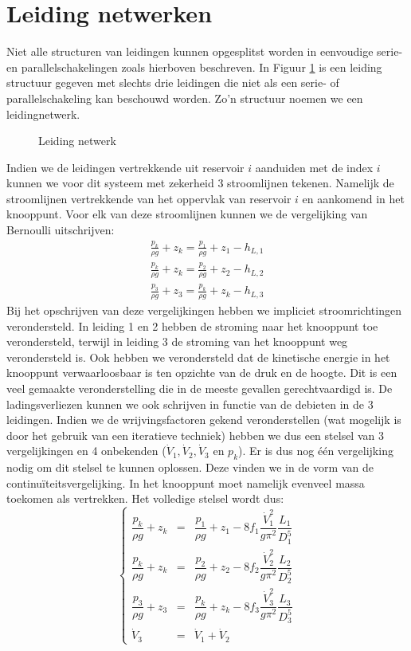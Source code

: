 	\section{Leiding netwerken}
	\label{sec:Leiding netwerken}	
Niet alle structuren van leidingen kunnen opgesplitst worden in eenvoudige serie- en parallelschakelingen zoals hierboven beschreven. In Figuur \ref{fig:leidingnetwerk} is een leiding structuur gegeven met slechts drie leidingen die niet als een serie- of parallelschakeling kan beschouwd worden. Zo'n structuur noemen we een leidingnetwerk.
\begin{figure}
	\centering
	
	\caption{Leiding netwerk}
	\label{fig:leidingnetwerk}
\end{figure}
Indien we de leidingen vertrekkende uit reservoir $i$ aanduiden met de index $i$ kunnen we voor dit systeem met zekerheid 3 stroomlijnen tekenen. Namelijk de stroomlijnen vertrekkende van het oppervlak van reservoir $i$ en aankomend in het knooppunt. Voor elk van deze stroomlijnen kunnen we de vergelijking van Bernoulli uitschrijven:
\begin{eqnarray}
	\frac{p_k}{\rho g} + z_k = \frac{p_1}{\rho g} + z_1 - h_{L,1} \nonumber \\
	\frac{p_k}{\rho g} + z_k = \frac{p_2}{\rho g} + z_2 - h_{L,2} \\
	\frac{p_3}{\rho g} + z_3 = \frac{p_k}{\rho g} + z_k - h_{L,3} \nonumber
\end{eqnarray} 
Bij het opschrijven van deze vergelijkingen hebben we impliciet stroomrichtingen verondersteld. In leiding 1 en 2 hebben de stroming naar het knooppunt toe verondersteld, terwijl in leiding 3 de stroming van het knooppunt weg verondersteld is. Ook hebben we verondersteld dat de kinetische energie in het knooppunt verwaarloosbaar is ten opzichte van de druk en de hoogte. Dit is een veel gemaakte veronderstelling die in de meeste gevallen gerechtvaardigd is. De ladingsverliezen kunnen we ook schrijven in functie van de debieten in de 3 leidingen. Indien we de wrijvingsfactoren gekend veronderstellen (wat mogelijk is door het gebruik van een iteratieve techniek) hebben we dus een stelsel van 3 vergelijkingen en 4 onbekenden ($\dot{V}_1,\dot{V}_2,\dot{V}_3$ en $p_k$). Er is dus nog één vergelijking nodig om dit stelsel te kunnen oplossen. Deze vinden we in de vorm van de continuïteitsvergelijking. In het knooppunt moet namelijk evenveel massa toekomen als vertrekken. Het volledige stelsel wordt dus:
\begin{equation}
	\left\{
	\begin{array}{lcl}
		\dfrac{p_k}{\rho g} + z_k &=& \dfrac{p_1}{\rho g} + z_1 - 8 f_1 \dfrac{\dot{V}_1^2}{g \pi^2} \dfrac{L_1}{D_1^5} \\
		\dfrac{p_k}{\rho g} + z_k &=& \dfrac{p_2}{\rho g} + z_2 - 8 f_2 \dfrac{\dot{V}_2^2}{g \pi^2} \dfrac{L_2}{D_2^5} \\
		\dfrac{p_3}{\rho g} + z_3 &=& \dfrac{p_k}{\rho g} + z_k - 8 f_3 \dfrac{\dot{V}_3^2}{g \pi^2} \dfrac{L_3}{D_3^5} \\
		\dot{V}_3 &=& \dot{V}_1 + \dot{V}_2
	\end{array}
	\right.
\end{equation}

